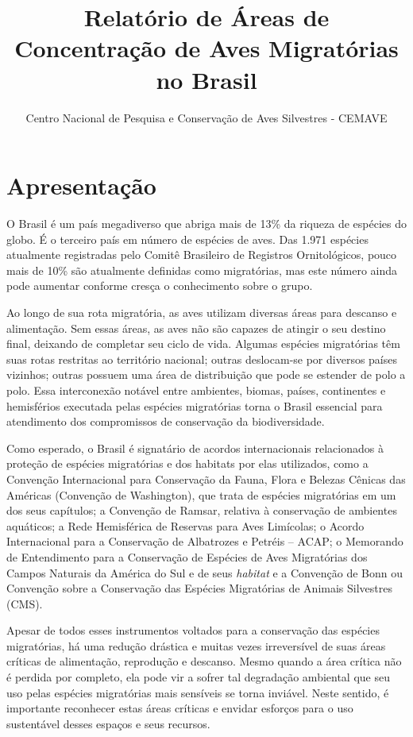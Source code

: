 \documentclass[
  oneside]{scrbook}
\title{Relatório de Áreas de Concentração de Aves Migratórias no Brasil}
\author{Centro Nacional de Pesquisa e Conservação de Aves Silvestres - CEMAVE}
\date{}
\begin{document}

\maketitle

{
\setcounter{tocdepth}{2}
\tableofcontents
}
\pagestyle{plain}

\hypertarget{apresentacao}{%
\chapter*{Apresentação}\label{apresentacao}}


O Brasil é um país megadiverso que abriga mais de 13\% da riqueza de espécies do globo. É o terceiro país em número de espécies de aves. Das 1.971 espécies atualmente registradas pelo Comitê Brasileiro de Registros Ornitológicos, pouco mais de 10\% são atualmente definidas como migratórias, mas este número ainda pode aumentar conforme cresça o conhecimento sobre o grupo.

Ao longo de sua rota migratória, as aves utilizam diversas áreas para descanso e alimentação. Sem essas áreas, as aves não são capazes de atingir o seu destino final, deixando de completar seu ciclo de vida. Algumas espécies migratórias têm suas rotas restritas ao território nacional; outras deslocam-se por diversos países vizinhos; outras possuem uma área de distribuição que pode se estender de polo a polo. Essa interconexão notável entre ambientes, biomas, países, continentes e hemisférios executada pelas espécies migratórias torna o Brasil essencial para atendimento dos compromissos de conservação da biodiversidade.

Como esperado, o Brasil é signatário de acordos internacionais relacionados à proteção de espécies migratórias e dos habitats por elas utilizados, como a Convenção Internacional para Conservação da Fauna, Flora e Belezas Cênicas das Américas (Convenção de Washington), que trata de espécies migratórias em um dos seus capítulos; a Convenção de Ramsar, relativa à conservação de ambientes aquáticos; a Rede Hemisférica de Reservas para Aves Limícolas; o Acordo Internacional para a Conservação de Albatrozes e Petréis -- ACAP; o Memorando de Entendimento para a Conservação de Espécies de Aves Migratórias dos Campos Naturais da América do Sul e de seus \emph{habitat} e a Convenção de Bonn ou Convenção sobre a Conservação das Espécies Migratórias de Animais Silvestres (CMS).

Apesar de todos esses instrumentos voltados para a conservação das espécies migratórias, há uma redução drástica e muitas vezes irreversível de suas áreas críticas de alimentação, reprodução e descanso. Mesmo quando a área crítica não é perdida por completo, ela pode vir a sofrer tal degradação ambiental que seu uso pelas espécies migratórias mais sensíveis se torna inviável. Neste sentido, é importante reconhecer estas áreas críticas e envidar esforços para o uso sustentável desses espaços e seus recursos.
\end{document}
